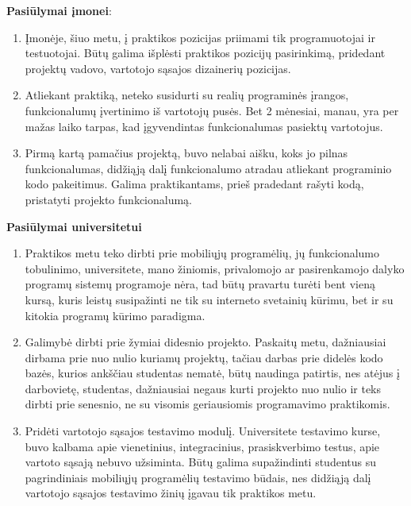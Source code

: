 \documentclass{VUMIFPSPraktika}
\begin{document}
\textbf{Pasiūlymai įmonei}:
\begin{enumerate}
    \item Įmonėje, šiuo metu, į praktikos pozicijas priimami tik programuotojai ir testuotojai. Būtų galima išplėsti praktikos pozicijų pasirinkimą, pridedant projektų vadovo, vartotojo sąsajos dizainerių pozicijas.
    \item Atliekant praktiką, neteko susidurti su realių programinės įrangos, funkcionalumų įvertinimo iš vartotojų pusės. Bet 2 mėnesiai, manau, yra per mažas laiko tarpas, kad įgyvendintas funkcionalumas pasiektų vartotojus.
    \item Pirmą kartą pamačius projektą, buvo nelabai aišku, koks jo pilnas funkcionalumas, didžiąją dalį funkcionalumo atradau atliekant programinio kodo pakeitimus. Galima praktikantams, prieš pradedant rašyti kodą, pristatyti projekto funkcionalumą.
\end{enumerate}


\textbf{Pasiūlymai universitetui}
\begin{enumerate}
    \item Praktikos metu teko dirbti prie mobiliųjų programėlių, jų funkcionalumo tobulinimo, universitete, mano žiniomis, privalomojo ar pasirenkamojo dalyko programų sistemų programoje nėra, tad būtų pravartu turėti bent vieną kursą, kuris leistų susipažinti ne tik su interneto svetainių kūrimu, bet ir su kitokia programų kūrimo paradigma.
    \item Galimybė dirbti prie žymiai didesnio projekto. Paskaitų metu, dažniausiai dirbama prie nuo nulio kuriamų projektų, tačiau darbas prie didelės kodo bazės, kurios ankščiau studentas nematė, būtų naudinga patirtis, nes atėjus į darbovietę, studentas, dažniausiai negaus kurti projekto nuo nulio ir teks dirbti prie senesnio, ne su visomis geriausiomis programavimo praktikomis.
    \item Pridėti vartotojo sąsajos testavimo modulį. Universitete testavimo kurse, buvo kalbama apie vienetinius, integracinius, prasiskverbimo testus, apie vartoto sąsają nebuvo užsiminta. Būtų galima supažindinti studentus su pagrindiniais mobiliųjų programėlių testavimo būdais, nes didžiąją dalį vartotojo sąsajos testavimo žinių įgavau tik praktikos metu. 
\end{enumerate}
\end{document}

